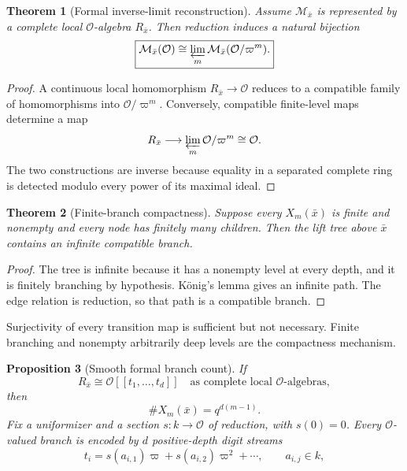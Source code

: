 \documentclass[11pt]{article}
\newtheorem{theorem}{Theorem}[section]
\newtheorem{proposition}[theorem]{Proposition}
\theoremstyle{definition}
\theoremstyle{remark}
\newcommand{\Ocal}{\mathcal O}
\begin{document}
\begin{theorem}[Formal inverse-limit reconstruction]\label{px:3.2}
Assume \(\mathcal M_{\bar x}\) is represented by a complete local \(\Ocal\)-algebra \(R_{\bar x}\).  Then reduction induces a natural bijection
\[
\boxed{
\mathcal M_{\bar x}(\Ocal)
\cong
\varprojlim_m
\mathcal M_{\bar x}(\Ocal/\varpi^m).
}
\]
\end{theorem}

\begin{proof}
A continuous local homomorphism \(R_{\bar x}\to\Ocal\) reduces to a compatible family of homomorphisms into \(\Ocal/\varpi^m\).  Conversely, compatible finite-level maps determine a map
\[
R_{\bar x}\longrightarrow\varprojlim_m\Ocal/\varpi^m\cong\Ocal.
\]
The two constructions are inverse because equality in a separated complete ring is detected modulo every power of its maximal ideal.
\end{proof}

\begin{theorem}[Finite-branch compactness]\label{px:3.3}
Suppose every \(X_m(\bar x)\) is finite and nonempty and every node has finitely many children.  Then the lift tree above \(\bar x\) contains an infinite compatible branch.
\end{theorem}

\begin{proof}
The tree is infinite because it has a nonempty level at every depth, and it is finitely branching by hypothesis.  K\"onig's lemma gives an infinite path.  The edge relation is reduction, so that path is a compatible branch.
\end{proof}

Surjectivity of every transition map is sufficient but not necessary.  Finite branching and nonempty arbitrarily deep levels are the compactness mechanism.

\begin{proposition}[Smooth formal branch count]\label{px:3.4}
If
\[
R_{\bar x}\cong\Ocal[[t_1,\ldots,t_d]]\quad\text{as complete local }\Ocal\text{-algebras},
\]
then
\[
\boxed{
\#X_m(\bar x)=q^{d(m-1)}.
}
\]
Fix a uniformizer and a section \(s:k\to\Ocal\) of reduction, with \(s(0)=0\). Every \(\Ocal\)-valued branch is encoded by \(d\) positive-depth digit streams
\[
t_i=s(a_{i,1})\varpi+s(a_{i,2})\varpi^2+\cdots,
\qquad a_{i,j}\in k,
\]
\end{proposition}
\end{document}
